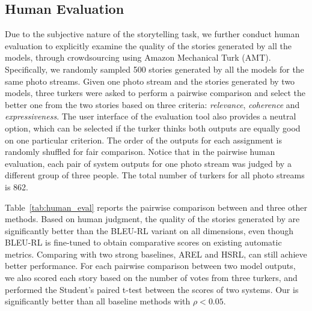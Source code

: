 \documentclass[letterpaper]{article} \usepackage{aaai20}  \usepackage{times}  \usepackage{helvet} \usepackage{courier}  \usepackage[hyphens]{url}  \usepackage{graphicx} \urlstyle{rm} \def\UrlFont{\rm}  \usepackage{graphicx}  \frenchspacing  \setlength{\pdfpagewidth}{8.5in}  \setlength{\pdfpageheight}{11in}  \usepackage{times}
\newcommand{\bleu}{BLEU-RL }
\begin{document}
\subsection{Human Evaluation}
Due to the subjective nature of the storytelling task, we further conduct human evaluation to explicitly examine the quality of the stories generated by all the models, through crowdsourcing using Amazon Mechanical Turk (AMT). 
Specifically, we randomly sampled 500 stories generated by all the models for the same photo streams. Given one photo stream and the stories generated by two models, three turkers were asked to perform a pairwise comparison and select the better one from the two stories based on three criteria: \textit{relevance}, \textit{coherence} and \textit{expressiveness}. 
The user interface of the evaluation tool also provides a neutral option, which can be selected if the turker thinks both outputs are equally good on one particular criterion. The order of the outputs for each assignment is randomly shuffled for fair comparison. Notice that in the pairwise human evaluation, each pair of system outputs for one photo stream was judged by a different group of three people. The total number of turkers for all photo streams is 862.

Table~\ref{tab:human_eval} reports the pairwise comparison between \model and three other methods. 
Based on human judgment, the quality of the stories generated by \model are significantly better than the \bleu variant on all dimensions, even though \bleu is fine-tuned to obtain comparative scores on existing automatic metrics.  Comparing with two strong baselines, AREL and HSRL, \model can still achieve better performance.  For each pairwise comparison between two model outputs, we also scored each story based on the number of votes from three turkers, and performed the Student's paired t-test between the scores of two systems. Our \model is significantly better than all baseline methods with $\rho<0.05$.
\end{document}
